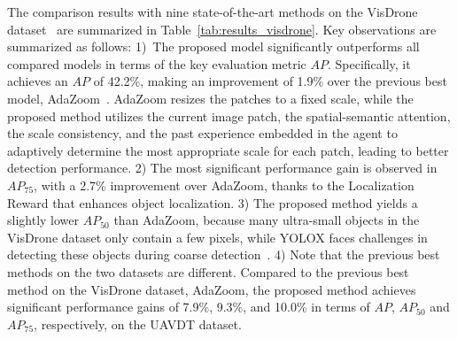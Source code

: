 \documentclass[letterpaper]{article} %
\def \eg {\emph{e.g.}}
\begin{document}
The comparison results with nine state-of-the-art methods on the VisDrone dataset~\cite{Zhu_2022_VisDrone} are summarized in Table~\ref{tab:results_visdrone}. %
Key observations are summarized as follows:
1)~The proposed model significantly outperforms %
all compared models in terms of the key evaluation metric $AP$. Specifically, %
it achieves an $AP$ of 42.2\%, making an improvement of 1.9\% over the %
previous best model, AdaZoom~\cite{Xu_2022_AdaZoom}. AdaZoom resizes the patches to a fixed scale, while the proposed method %
utilizes the current image patch, the spatial-semantic attention, the scale consistency, and the past experience embedded in the agent to adaptively determine the most appropriate scale for each patch, %
leading to better detection performance. 2) %
The most significant performance gain is observed in $AP_{75}$, with a 2.7\% improvement over AdaZoom, thanks to the Localization Reward that enhances object localization.
3) The proposed method yields a slightly lower $AP_{50}$ than AdaZoom, because many ultra-small objects in the VisDrone dataset only contain a few pixels, while YOLOX faces challenges in detecting these objects during coarse detection~\cite{wang2023improved}. 4) Note that %
the previous best methods on the two datasets are different. Compared to the previous best method on the VisDrone dataset, AdaZoom, the proposed method achieves significant performance gains of 7.9\%, 9.3\%, and 10.0\% in terms of $AP$, $AP_{50}$ and $AP_{75}$, respectively, on the UAVDT dataset.
\end{document}
